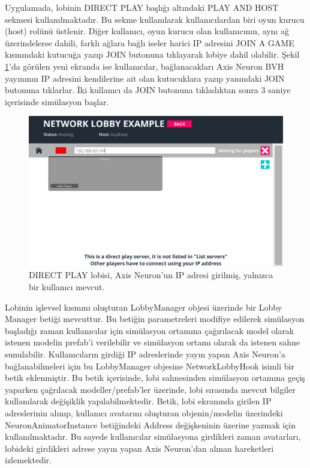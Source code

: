 \documentclass[a4paper, 12pt, titlepage]{article}
\begin{document}
Uygulamada, lobinin DIRECT PLAY başlığı altındaki PLAY AND HOST sekmesi kullanılmaktadır. Bu sekme
kullanılarak kullanıcılardan biri oyun kurucu (host) rolünü üstlenir. Diğer kullanıcı, oyun kurucu
olan kullanıcının, aynı ağ üzerindelerse dahili, farklı ağlara bağlı iseler harici IP adresini JOIN
A GAME kısmındaki kutucuğa yazıp JOIN butonuna tıklayarak lobiye dahil olabilir. Şekil \ref{l1}’da
görülen yeni ekranda ise kullanıcılar, bağlanacakları Axis Neuron BVH yayınının IP adresini
kendilerine ait olan kutucuklara yazıp yanındaki JOIN butonuna tıklarlar. İki kullanıcı da JOIN
butonuna tıkladıktan sonra 3 saniye içerisinde simülasyon başlar.

\begin{figure}[ht!]
    \centering
        \includegraphics[width=6in]{images/l1}
    \caption{DIRECT PLAY lobisi, Axis Neuron'un IP adresi girilmiş, yalnızca bir kullanıcı mevcut.}
    \label{l1}
\end{figure}

Lobinin işlevsel kısmını oluşturan LobbyManager objesi üzerinde bir Lobby Manager betiği mevcuttur.
Bu betiğin parametreleri modifiye edilerek simülasyon başladığı zaman kullanıcılar için simülasyon
ortamına çağırılacak model olarak istenen modelin prefab’i verilebilir ve simülasyon ortamı olarak
da istenen sahne sunulabilir. Kullanıcıların girdiği IP adreslerinde yayın yapan Axis Neuron’a
bağlanabilmeleri için bu LobbyManager objesine NetworkLobbyHook isimli bir betik eklenmiştir. Bu
betik içerisinde, lobi sahnesinden simülasyon ortamına geçiş yaparken çağrılacak modeller/prefab’ler
üzerinde, lobi sırasında mevcut bilgiler kullanılarak değişiklik yapılabilmektedir. Betik, lobi
ekranında girilen IP adreslerinin alınıp, kullanıcı avatarını oluşturan objenin/modelin üzerindeki
NeuronAnimatorInstance betiğindeki Address değişkeninin üzerine yazmak için kullanılmaktadır. Bu
sayede kullanıcılar simülasyona girdikleri zaman avatarları, lobideki girdikleri adrese yayın yapan
Axis Neuron’dan alınan hareketleri izlemektedir.
\end{document}
